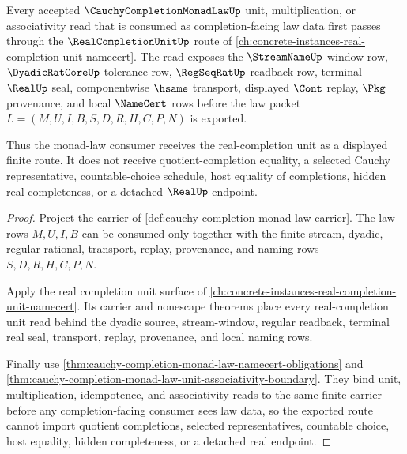 \begin{theorem}
\label{thm:cauchy-completion-monad-law-real-completion-unit-route}
Every accepted $\CauchyCompletionMonadLawUp$ unit, multiplication, or associativity read that is consumed as completion-facing law data first passes through the $\RealCompletionUnitUp$ route of \autoref{ch:concrete-instances-real-completion-unit-namecert}. The read exposes the $\StreamNameUp$ window row, $\DyadicRatCoreUp$ tolerance row, $\RegSeqRatUp$ readback row, terminal $\RealUp$ seal, componentwise $\hsame$ transport, displayed $\Cont$ replay, $\Pkg$ provenance, and local $\NameCert$ rows before the law packet $L=(M,U,I,B,S,D,R,H,C,P,N)$ is exported.

Thus the monad-law consumer receives the real-completion unit as a displayed finite route. It does not receive quotient-completion equality, a selected Cauchy representative, countable-choice schedule, host equality of completions, hidden real completeness, or a detached $\RealUp$ endpoint.
\end{theorem}

\begin{proof}
Project the carrier of \autoref{def:cauchy-completion-monad-law-carrier}. The law rows $M,U,I,B$ can be consumed only together with the finite stream, dyadic, regular-rational, transport, replay, provenance, and naming rows $S,D,R,H,C,P,N$.

Apply the real completion unit surface of \autoref{ch:concrete-instances-real-completion-unit-namecert}. Its carrier and nonescape theorems place every real-completion unit read behind the dyadic source, stream-window, regular readback, terminal real seal, transport, replay, provenance, and local naming rows.

Finally use \autoref{thm:cauchy-completion-monad-law-namecert-obligations} and \autoref{thm:cauchy-completion-monad-law-unit-associativity-boundary}. They bind unit, multiplication, idempotence, and associativity reads to the same finite carrier before any completion-facing consumer sees law data, so the exported route cannot import quotient completions, selected representatives, countable choice, host equality, hidden completeness, or a detached real endpoint.
\end{proof}
